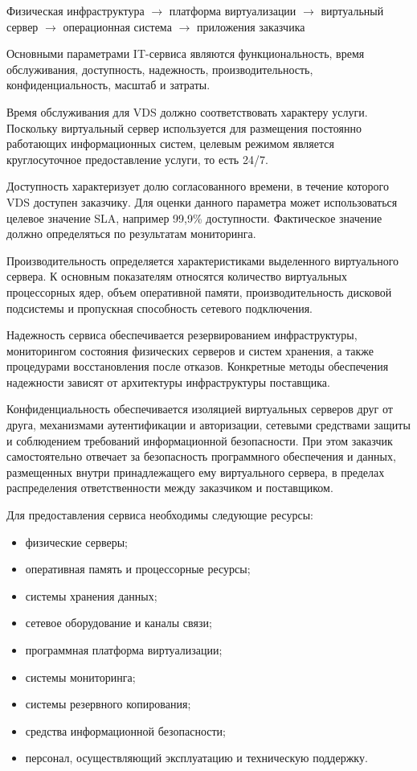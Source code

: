 \documentclass[14pt,a4paper]{extarticle}
\begin{document}
    \begin{center}
    Физическая инфраструктура $\rightarrow$ платформа виртуализации $\rightarrow$
        виртуальный сервер $\rightarrow$ операционная система $\rightarrow$
        приложения заказчика
    \end{center}

    Основными параметрами IT-сервиса являются функциональность, время обслуживания,
    доступность, надежность, производительность, конфиденциальность, масштаб и
    затраты.

    Время обслуживания для VDS должно соответствовать характеру услуги. Поскольку
    виртуальный сервер используется для размещения постоянно работающих
    информационных систем, целевым режимом является круглосуточное предоставление
    услуги, то есть 24/7.

    Доступность характеризует долю согласованного времени, в течение которого VDS
    доступен заказчику. Для оценки данного параметра может использоваться целевое
    значение SLA, например 99,9\% доступности. Фактическое значение должно
    определяться по результатам мониторинга.

    Производительность определяется характеристиками выделенного виртуального
    сервера. К основным показателям относятся количество виртуальных процессорных
    ядер, объем оперативной памяти, производительность дисковой подсистемы и
    пропускная способность сетевого подключения.

    Надежность сервиса обеспечивается резервированием инфраструктуры, мониторингом
    состояния физических серверов и систем хранения, а также процедурами
    восстановления после отказов. Конкретные методы обеспечения надежности зависят
    от архитектуры инфраструктуры поставщика.

    Конфиденциальность обеспечивается изоляцией виртуальных серверов друг от друга,
    механизмами аутентификации и авторизации, сетевыми средствами защиты и
    соблюдением требований информационной безопасности. При этом заказчик
    самостоятельно отвечает за безопасность программного обеспечения и данных,
    размещенных внутри принадлежащего ему виртуального сервера, в пределах
    распределения ответственности между заказчиком и поставщиком.

    Для предоставления сервиса необходимы следующие ресурсы:

    \begin{itemize}
    \item физические серверы;
    \item оперативная память и процессорные ресурсы;
    \item системы хранения данных;
    \item сетевое оборудование и каналы связи;
    \item программная платформа виртуализации;
    \item системы мониторинга;
    \item системы резервного копирования;
    \item средства информационной безопасности;
    \item персонал, осуществляющий эксплуатацию и техническую поддержку.
    \end{itemize}
\end{document}
